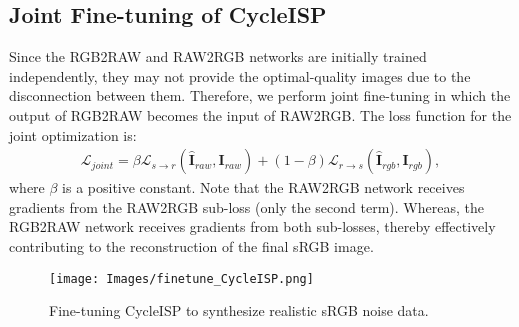 \documentclass[10pt,twocolumn,letterpaper]{article}
\begin{document}
\subsection{Joint Fine-tuning of CycleISP}
\label{sec:finetune}
Since the RGB2RAW and RAW2RGB networks are initially trained independently, they may not provide the optimal-quality images due to the disconnection between them. 
Therefore, we perform joint fine-tuning in which the output of RGB2RAW becomes the input of RAW2RGB. 
The loss function for the joint optimization is:
\begin{align}
\label{Eq:loss joint}
\mathcal{L}_{joint}= \beta  \mathcal{L}_{{s\rightarrow r}}(\hat{\mathbf{I}}_{raw},\mathbf{I}_{raw}) + (1{-}\beta)  \mathcal{L}_{{r\rightarrow s}}(\hat{\mathbf{I}}_{rgb},\mathbf{I}_{rgb}), 
\nonumber
\end{align}
where $\beta$ is a positive constant. 
Note that the RAW2RGB network receives gradients from the RAW2RGB sub-loss (only the second term). 
Whereas, the RGB2RAW network receives gradients from both sub-losses, thereby effectively contributing to the reconstruction of the final sRGB image. 


\begin{figure}[t!]
\begin{center}
 \texttt{[image: Images/finetune\_CycleISP.png]}  
\end{center}\vspace{-1.4em}
    \caption{Fine-tuning CycleISP to synthesize realistic sRGB noise data.}\vspace{-2mm}
    \label{Fig:finetune}
\end{figure}
\end{document}
